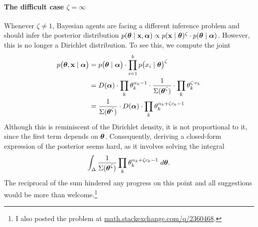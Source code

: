 \documentclass{../src/bcthesispart}
\begin{document}
\paragraph{The difficult case $\zeta=\infty$}

Whenever $\zeta\neq1$, Bayesian agents are facing a different inference problem and should infer the posterior distribution $p(\boldsymbol{\mathbf{\theta}}\mid\boldsymbol{\mathbf{x}}, \boldsymbol{\mathbf{\alpha}})\propto p(\boldsymbol{\mathbf{x}} \mid \boldsymbol{\mathbf{\theta}})^\zeta \cdot p(\boldsymbol{\mathbf{\theta}} \mid\boldsymbol{\mathbf{\alpha}})$.
However, this is no longer a Dirichlet distribution. To see this, we compute the joint
\begin{align}
	p\bigl(\boldsymbol{\mathbf{\theta}}, \boldsymbol{\mathbf{x}} \mid \boldsymbol{\mathbf{\alpha}} \bigr)
		&= p\bigl(\boldsymbol{\mathbf{\theta}} \mid \boldsymbol{\mathbf{\alpha}} \bigr)
			\cdot \prod_{i=1}^b p\bigr(x_i \mid \boldsymbol{\mathbf{\theta}} \bigl)^\zeta
		\\
		&= D(\boldsymbol{\mathbf{\alpha}})
			\cdot \prod_k \theta_k^{\alpha_k - 1} 
			\cdot \frac{1}{\Sigma(\boldsymbol{\mathbf{\theta}}^\zeta)}
			\cdot \prod_k\theta_k^{\zeta \cdot c_k}
		\\
		&= \frac{1}{\Sigma(\boldsymbol{\mathbf{\theta}}^\zeta)}
			\cdot D(\boldsymbol{\mathbf{\alpha}})
			\cdot \prod_k \theta_k^{\alpha_k + \zeta c_k - 1}
\end{align}
Although this is reminiscent of the Dirichlet density, it is not proportional to it, since the first term depends on $\boldsymbol{\mathbf{\theta}}$.
Consequently, deriving a closed-form expression of the posterior seems hard, as it involves solving the integral
\begin{equation}
	\int_\Delta 
		\frac{1}{\Sigma(\boldsymbol{\mathbf{\theta}}^\zeta)} 
		\prod_k \theta_k^{\alpha_k + \zeta c_k -1} 
		\; d\boldsymbol{\mathbf{\theta}}.
\end{equation}
The reciprocal of the sum hindered any progress on this point and all suggestions would be more than welcome.\footnote{%
		I also posted the problem at \href{math.stackexchange.com/q/2360468}{math.stackexchange.com/q/2360468}.
	}
\end{document}
